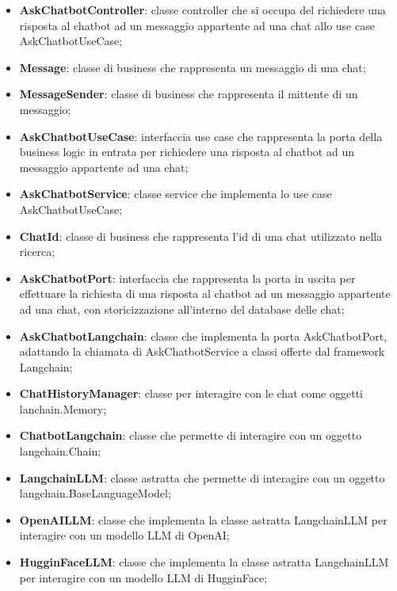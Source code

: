 \documentclass[10pt, a4paper]{article}
\begin{document}
\begin{itemize}
    \item \label{AskChatbotController}\textbf{AskChatbotController}: classe controller che si occupa del richiedere una risposta al chatbot ad un messaggio appartente ad una chat allo use case AskChatbotUseCase;
    \item \label{Message}\textbf{Message}: classe di business che rappresenta un messaggio di una chat;
    \item \label{MessageSender}\textbf{MessageSender}: classe di business che rappresenta il mittente di un messaggio;
    \item \label{AskChatbotUseCase}\textbf{AskChatbotUseCase}: interfaccia use case che rappresenta la porta della business logic in entrata per richiedere una risposta al chatbot ad un messaggio appartente ad una chat;
    \item \label{AskChatbotService}\textbf{AskChatbotService}: classe service che implementa lo use case AskChatbotUseCase;
    \item \label{ChatId}\textbf{ChatId}: classe di business che rappresenta l'id di una chat utilizzato nella ricerca;
    \item \label{AskChatbotPort}\textbf{AskChatbotPort}: interfaccia che rappresenta la porta in uscita per effettuare la richiesta di una risposta al chatbot ad un messaggio appartente ad una chat, con storicizzazione all'interno del database delle chat;
    \item \label{AskChatbotLangchain}\textbf{AskChatbotLangchain}: classe che implementa la porta AskChatbotPort, adattando la chiamata di AskChatbotService a classi offerte dal framework Langchain;
    \item \label{ChatHistoryManager}\textbf{ChatHistoryManager}: classe per interagire con le chat come oggetti lanchain.Memory;
    \item \label{ChatbotLangchain}\textbf{ChatbotLangchain}: classe che permette di interagire con un oggetto langchain.Chain;
    \item \label{LangchainLLM}\textbf{LangchainLLM}: classe astratta che permette di interagire con un oggetto langchain.BaseLanguageModel;
    \item \label{OpenAILLM}\textbf{OpenAILLM}: classe che implementa la classe astratta LangchainLLM per interagire con un modello LLM di OpenAI;
    \item \label{HugginFaceLLM}\textbf{HugginFaceLLM}: classe che implementa la classe astratta LangchainLLM per interagire con un modello LLM di HugginFace;

\end{itemize}
\end{document}

